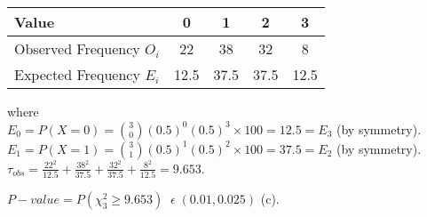 \documentclass[bigtut]{tutorial}
\begin{document}
\begin{tutorial}
\begin{questions}


\begin{solution}

\begin{center}
\begin{tabular}[ ]{|l||c|c|c|c|}\hline
Value  & 0 & 1 & 2 & 3\\\hline 
Observed Frequency $O_{i}$ & 22 & 38 & 32 & 8\\\hline
Expected Frequency $E_{i}$ & 12.5 & 37.5 & 37.5 & 12.5 \\\hline
\end{tabular}
\end{center}

where \\
$E_{0} = P( X =0 ) = {3 \choose 0} (0.5)^0 (0.5)^3  \times 100 = 12.5 = E_{3}$ (by symmetry). \\

$E_{1} = P( X =1 ) = {3 \choose 1} (0.5)^1 (0.5)^2  \times 100 = 37.5 = E_{2}$ (by symmetry). \\

$\tau_{obs} = \frac{22^2}{12.5} + \frac{38^2}{37.5} + \frac{32^2}{37.5}  + \frac{8^2}{12.5}= 9.653$. 

$P-value = P( \chi^2_{3} \geq 9.653 ) \;\; \epsilon \; (0.01,0.025)$ (c).


\end{solution}





\end{questions}
\end{tutorial}
\end{document}
